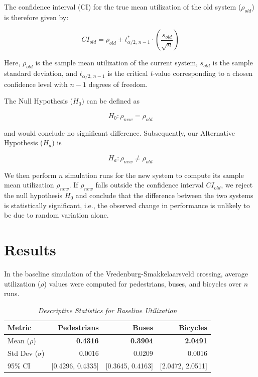 \documentclass[letterpaper, 10 pt, conference]{ieeeconf}
\begin{document}
\noindent The confidence interval (CI) for the true mean utilization of the old system (\( \rho_{old} \)) is therefore given by:  

\[
    CI_{old} = \rho_{old} \pm t^{*}_{\alpha/2, \, n-1} \cdot \left( \frac{s_{old}}{\sqrt{n}} \right)
\]

\noindent Here, \( {\rho}_{old} \) is the sample mean utilization of the current system, \( s_{old} \) is the sample standard deviation, and \( t_{\alpha/2, \, n-1} \) is the critical \textit{t}-value corresponding to a chosen confidence level with \( n - 1 \) degrees of freedom. 

\noindent The Null Hypothesis ($H_0)$ can be defined as 

$$H_0:\rho_{new}=\rho_{old}$$

and would conclude no significant difference. Subsequently, our Alternative Hypothesis ($H_a$) is 

$$H_a: \rho_{new} \neq \rho_{old}$$

\noindent We then perform \( n \) simulation runs for the new system to compute its sample mean utilization \( {\rho}_{new} \). If \( {\rho}_{new} \) falls outside the confidence interval \( CI_{old} \), we reject the null hypothesis \( H_0 \) and conclude that the difference between the two systems is statistically significant, i.e., the observed change in performance is unlikely to be due to random variation alone.


\section{Results}
In the baseline simulation of the Vredenburg-Smakkelaarsveld crossing, average
utilization ($\rho$) values were computed for pedestrians, buses, and bicycles over $n$ runs. 


\begin{table}[h]
	\caption{\textit{Descriptive Statistics for Baseline Utilization}}
	\label{tab:agent_performance}
		\begin{tabular}{lrrr}
			\toprule
			Metric & Pedestrians & Buses & Bicycles \\
			\midrule
			Mean ($\rho$) & \textbf{0.4316} & \textbf{0.3904} & \textbf{2.0491} \\
			Std Dev ($\sigma$) & 0.0016 & 0.0209 & 0.0016 \\
			95\% CI & [0.4296, 0.4335] & [0.3645, 0.4163] & [2.0472, 2.0511] \\
			\bottomrule
		\end{tabular}
\end{table}
\end{document}
